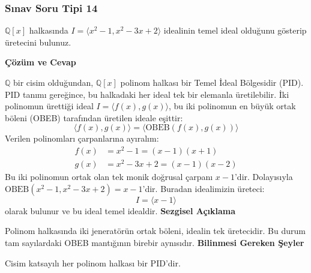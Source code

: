 \documentclass[11pt, a4paper]{article}
\newenvironment{cozum}{
    \vspace{0.5cm}
    \noindent\textcolor{green!60!black}{\faCheckCircle\enspace \textbf{\Large Çözüm ve Cevap}}\par\vspace{0.2cm}
}{}
\newenvironment{sezgisel}{
    \vspace{0.5cm}
    \noindent\textcolor{orange!80!black}{\faLightbulb\enspace \textbf{\Large Sezgisel Açıklama}}\par\vspace{0.2cm}
    \itshape
}{}
\newenvironment{bilgi}{
    \vspace{0.5cm}
    \noindent\textcolor{red!70!black}{\faExclamationTriangle\enspace \textbf{\Large Bilinmesi Gereken Şeyler}}\par\vspace{0.2cm}
}{}
\begin{document}
\subsubsection{Sınav Soru Tipi 14}
\begin{sinavbox}
$\mathbb{Q}[x]$ halkasında $I = \langle x^2-1, x^2-3x+2 \rangle$ idealinin temel ideal olduğunu gösterip üretecini bulunuz.
\end{sinavbox}
\begin{cozum}
$\mathbb{Q}$ bir cisim olduğundan, $\mathbb{Q}[x]$ polinom halkası bir Temel İdeal Bölgesidir (PID). PID tanımı gereğince, bu halkadaki her ideal tek bir elemanla üretilebilir.
İki polinomun ürettiği ideal $I = \langle f(x), g(x) \rangle$, bu iki polinomun en büyük ortak böleni (OBEB) tarafından üretilen ideale eşittir:
\[ \langle f(x), g(x) \rangle = \langle \text{OBEB}(f(x), g(x)) \rangle \]
Verilen polinomları çarpanlarına ayıralım:
\begin{align*}
f(x) &= x^2-1 = (x-1)(x+1) \\
g(x) &= x^2-3x+2 = (x-1)(x-2)
\end{align*}
Bu iki polinomun ortak olan tek monik doğrusal çarpanı $x-1$'dir.
Dolayısıyla $\text{OBEB}(x^2-1, x^2-3x+2) = x-1$'dir.
Buradan idealimizin üreteci:
\[ I = \langle x-1 \rangle \]
olarak bulunur ve bu ideal temel idealdir.
\end{cozum}
\begin{sezgisel}
Polinom halkasında iki jeneratörün ortak böleni, idealin tek üretecidir. Bu durum tam sayılardaki OBEB mantığının birebir aynısıdır.
\end{sezgisel}
\begin{bilgi}
Cisim katsayılı her polinom halkası bir PID'dir.
\end{bilgi}

\newpage
\end{document}
